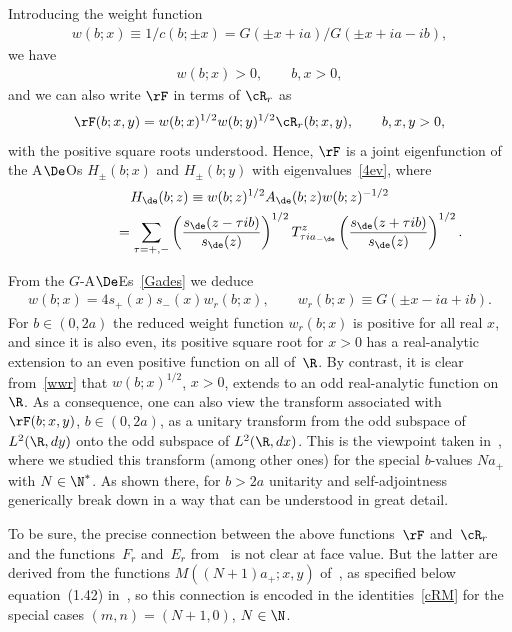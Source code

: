 \documentclass[pdftex]{sigma}
\numberwithin{equation}{section}
\begin{document}
Introducing the weight function
\begin{gather}\label{w}
w(b;x)\equiv 1/c(b;\pm x)=G(\pm x +ia)/G(\pm x +ia-ib),
\end{gather}
we have
\begin{gather}
w(b;x)>0, \qquad b,x>0,
\end{gather}
and we can also write $\rF$ in terms of $\cR_r$ as
\begin{gather}\label{FR}
\rF(b;x,y) =w(b;x)^{1/2}w(b;y)^{1/2}\cR_r(b;x,y),\qquad b,x,y>0,
\end{gather}
with the positive square roots understood.
Hence, $\rF$ is a joint eigenfunction of the A$\De$Os $H_{\pm}(b;x)$ and
$H_{\pm}(b;y)$
with eigenvalues~\eqref{4ev}, where
\begin{gather} 
H_{\de}(b;z)     \equiv    w(b;z)^{1/2} A_{\de}(b;z)w(b;z)^{-1/2}
\nonumber \\
\label{H} \phantom{H_{\de}(b;z)}{}    =
\sum_{\tau=+,-}\left( \frac{s_{\de}(z-\tau ib)}{s_{\de}(z)}\right)^{1/2}T^z_{\tau ia_{-\de}}\left(\frac{s_{\de}(z+\tau ib)}{s_{\de}(z)}\right)^{1/2}.
\end{gather}

From the $G$-A$\De$Es~\eqref{Gades}
we deduce
\begin{gather}\label{wwr}
w(b;x) =4s_{+}(x)s_{-}(x)w_r(b;x), \qquad w_r(b;x)\equiv G(\pm x -ia+ib).
\end{gather}
For $b\in (0,2a)$ the reduced weight function $w_r(b;x)$ is positive for all real $x$, and since it is also even, its positive square root for $x>0$ has a real-analytic extension to an even positive function on all of~$\R$. By contrast, it is clear from~\eqref{wwr} that $w(b;x)^{1/2}$, $x>0$, extends to an odd real-analytic function on~$\R$. As a consequence, one can also view the transform associated with $\rF(b;x,y)$, $b\in (0,2a)$, as a unitary transform from the odd subspace of $L^2(\R,dy)$ onto the odd subspace of $L^2(\R,dx)$. This is the viewpoint taken in~\cite{Hilb}, where we studied this transform (among other ones) for the special $b$-values $Na_{+}$ with $N\in\N^{*}$. As shown there, for $b>2a$ unitarity and self-adjointness generically break down in a way that can be understood in great detail.

To be sure, the precise connection between the above functions~$\rF$ and~$\cR_r$ and the  functions~$F_r$ and~$E_r$ from~\cite{Hilb} is not clear at face value. But the latter are derived from the functions $M((N+1)a_{+};x,y)$ of~\cite{GLFII}, as specif\/ied below equation~(1.42) in~\cite{Hilb}, so this connection is encoded in the identities~\eqref{cRM} for the special cases $(m,n)=(N+1,0)$, $N\in\N$.
\end{document}
